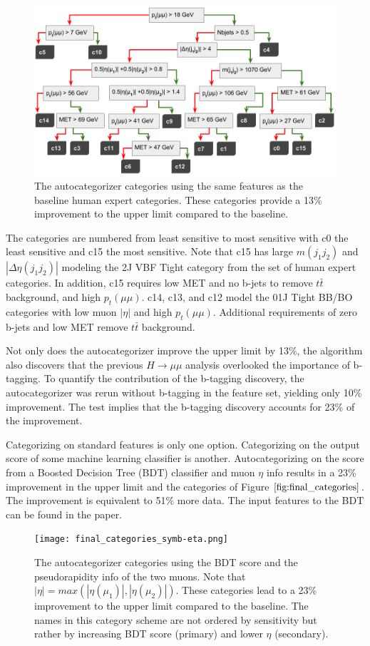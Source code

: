 \documentclass[review]{elsarticle}
\begin{document}
\begin{figure}[h!]
  \centering
  \includegraphics[width=0.98\linewidth]{autocat_categories.png}
  \caption
  {The autocategorizer categories using the same features as the baseline human expert categories. These categories provide a 13\% improvement to the upper limit compared to the baseline.}
  \label{fig:autocats}
\end{figure}
The categories are numbered from least sensitive to most sensitive with c0 the least sensitive and c15 the most sensitive. Note that c15 has large $m(j_1j_2)$ and $|\Delta\eta(j_1j_2)|$ modeling the 2J VBF Tight category from the set of human expert categories. In addition, c15 requires low MET and no b-jets to remove $t\bar{t}$ background, and high $p_t(\mu\mu)$.
c14, c13, and c12 model the 01J Tight BB/BO categories with low muon $|\eta|$ and high $p_t(\mu\mu)$. Additional requirements of zero b-jets and low MET remove $t\bar{t}$ background. 
\FloatBarrier

Not only does the autocategorizer improve the upper limit by 13\%, the algorithm also discovers that the previous $H\rightarrow\mu\mu$ analysis overlooked the importance of b-tagging. To quantify the contribution of the b-tagging discovery, the autocategorizer was rerun without b-tagging in the feature set, yielding only 10\% improvement. The test implies that the b-tagging discovery accounts for 23\% of the improvement. 

Categorizing on standard features is only one option. Categorizing on the output score of some machine learning classifier is another. Autocategorizing on the score from a Boosted Decision Tree (BDT) classifier and muon $\eta$ info results in a 23\% improvement in the upper limit and the categories of Figure $\ref{fig:final_categories}$. The improvement is equivalent to 51\% more data. The input features to the BDT can be found in the paper.
\begin{figure}[h!]
  \centering
  \texttt{[image: final\_categories\_symb-eta.png]}
  \caption
  {The autocategorizer categories using the BDT score and the pseudorapidity info of the two muons. Note that $|\eta| = max(|\eta(\mu_1)|,|\eta(\mu_2)|)$. These categories lead to a 23\% improvement to the upper limit compared to the baseline. The names in this category scheme are not ordered by sensitivity but rather by increasing BDT score (primary) and lower $\eta$ (secondary).}
  \label{fig:final_categories}
\end{figure}
\FloatBarrier
\end{document}
